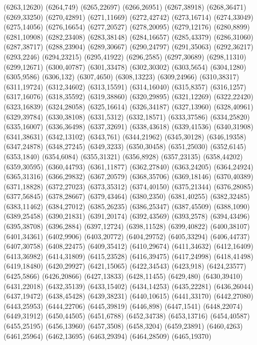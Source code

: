 (6263,12620)
(6264,749)
(6265,22697)
(6266,26951)
(6267,38918)
(6268,36471)
(6269,33250)
(6270,42891)
(6271,11669)
(6272,42742)
(6273,16714)
(6274,33049)
(6275,14056)
(6276,16654)
(6277,20527)
(6278,20095)
(6279,12176)
(6280,8899)
(6281,10908)
(6282,23408)
(6283,38148)
(6284,16657)
(6285,43379)
(6286,31060)
(6287,38717)
(6288,23904)
(6289,30667)
(6290,24797)
(6291,35063)
(6292,36217)
(6293,2246)
(6294,23215)
(6295,41922)
(6296,2585)
(6297,30689)
(6298,11310)
(6299,12671)
(6300,40787)
(6301,33478)
(6302,30302)
(6303,5654)
(6304,1280)
(6305,9586)
(6306,132)
(6307,4650)
(6308,13223)
(6309,24966)
(6310,38317)
(6311,19724)
(6312,34602)
(6313,15591)
(6314,16040)
(6315,8357)
(6316,1257)
(6317,16076)
(6318,35592)
(6319,38860)
(6320,29895)
(6321,12269)
(6322,22420)
(6323,16839)
(6324,28058)
(6325,16614)
(6326,34187)
(6327,13960)
(6328,40961)
(6329,39784)
(6330,38108)
(6331,5312)
(6332,18571)
(6333,37586)
(6334,25820)
(6335,16007)
(6336,36498)
(6337,32691)
(6338,43618)
(6339,41536)
(6340,31908)
(6341,38631)
(6342,13102)
(6343,761)
(6344,21962)
(6345,30128)
(6346,19358)
(6347,24878)
(6348,27245)
(6349,3233)
(6350,30458)
(6351,25030)
(6352,6145)
(6353,1840)
(6354,6084)
(6355,31321)
(6356,8928)
(6357,23135)
(6358,44202)
(6359,30595)
(6360,44793)
(6361,11877)
(6362,27840)
(6363,24205)
(6364,24924)
(6365,31316)
(6366,29832)
(6367,20579)
(6368,35706)
(6369,18146)
(6370,40389)
(6371,18828)
(6372,27023)
(6373,35312)
(6374,40150)
(6375,21344)
(6376,28085)
(6377,56845)
(6378,28667)
(6379,43464)
(6380,2350)
(6381,40255)
(6382,32485)
(6383,11462)
(6384,27012)
(6385,26235)
(6386,25347)
(6387,45509)
(6388,1090)
(6389,25458)
(6390,21831)
(6391,20174)
(6392,43569)
(6393,2578)
(6394,43496)
(6395,38708)
(6396,2884)
(6397,12724)
(6398,11528)
(6399,40822)
(6400,38107)
(6401,34361)
(6402,9906)
(6403,20772)
(6404,29752)
(6405,33294)
(6406,44737)
(6407,30758)
(6408,22475)
(6409,35412)
(6410,29674)
(6411,34632)
(6412,16409)
(6413,36982)
(6414,31809)
(6415,23528)
(6416,39475)
(6417,24998)
(6418,41498)
(6419,18480)
(6420,29927)
(6421,15065)
(6422,34543)
(6423,918)
(6424,23577)
(6425,5866)
(6426,20866)
(6427,13833)
(6428,11455)
(6429,480)
(6430,39410)
(6431,22018)
(6432,35139)
(6433,15402)
(6434,14253)
(6435,22281)
(6436,26044)
(6437,19472)
(6438,45428)
(6439,38231)
(6440,10615)
(6441,33170)
(6442,27080)
(6443,25953)
(6444,22706)
(6445,39819)
(6446,898)
(6447,1541)
(6448,22074)
(6449,31912)
(6450,44505)
(6451,6788)
(6452,34738)
(6453,13716)
(6454,40587)
(6455,25195)
(6456,13960)
(6457,3508)
(6458,3204)
(6459,23891)
(6460,4263)
(6461,25964)
(6462,13695)
(6463,29394)
(6464,28509)
(6465,19370)
